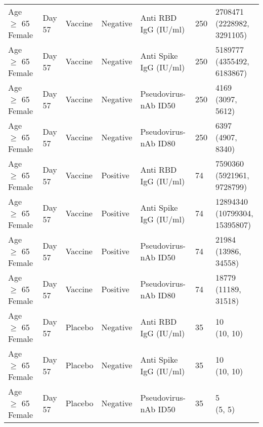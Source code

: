 \documentclass[]{book}
\theoremstyle{definition}
\theoremstyle{definition}
\theoremstyle{definition}
\newcommand{\1}{\mathbbm{1}}
\begin{document}
\begin{landscape}
\begin{ThreePartTable}
\begin{longtable}[t]{>{\raggedright\arraybackslash}p{7cm}llllll}
\hspace{1em}Age $\geq$ 65 Female & Day 57 & Vaccine & Negative & Anti RBD IgG (IU/ml) & 250 & \makecell[l]{2708471\\(2228982, 3291105)}\\
\hspace{1em}Age $\geq$ 65 Female & Day 57 & Vaccine & Negative & Anti Spike IgG (IU/ml) & 250 & \makecell[l]{5189777\\(4355492, 6183867)}\\
\hspace{1em}Age $\geq$ 65 Female & Day 57 & Vaccine & Negative & Pseudovirus-nAb ID50 & 250 & \makecell[l]{4169\\(3097, 5612)}\\
\hspace{1em}Age $\geq$ 65 Female & Day 57 & Vaccine & Negative & Pseudovirus-nAb ID80 & 250 & \makecell[l]{6397\\(4907, 8340)}\\
\hspace{1em}Age $\geq$ 65 Female & Day 57 & Vaccine & Positive & Anti RBD IgG (IU/ml) & 74 & \makecell[l]{7590360\\(5921961, 9728799)}\\
\hspace{1em}Age $\geq$ 65 Female & Day 57 & Vaccine & Positive & Anti Spike IgG (IU/ml) & 74 & \makecell[l]{12894340\\(10799304, 15395807)}\\
\hspace{1em}Age $\geq$ 65 Female & Day 57 & Vaccine & Positive & Pseudovirus-nAb ID50 & 74 & \makecell[l]{21984\\(13986, 34558)}\\
\hspace{1em}Age $\geq$ 65 Female & Day 57 & Vaccine & Positive & Pseudovirus-nAb ID80 & 74 & \makecell[l]{18779\\(11189, 31518)}\\
\hspace{1em}Age $\geq$ 65 Female & Day 57 & Placebo & Negative & Anti RBD IgG (IU/ml) & 35 & \makecell[l]{10\\(10, 10)}\\
\hspace{1em}Age $\geq$ 65 Female & Day 57 & Placebo & Negative & Anti Spike IgG (IU/ml) & 35 & \makecell[l]{10\\(10, 10)}\\
\hspace{1em}Age $\geq$ 65 Female & Day 57 & Placebo & Negative & Pseudovirus-nAb ID50 & 35 & \makecell[l]{5\\(5, 5)}\\

\end{longtable}
\end{ThreePartTable}
\end{landscape}
\end{document}
